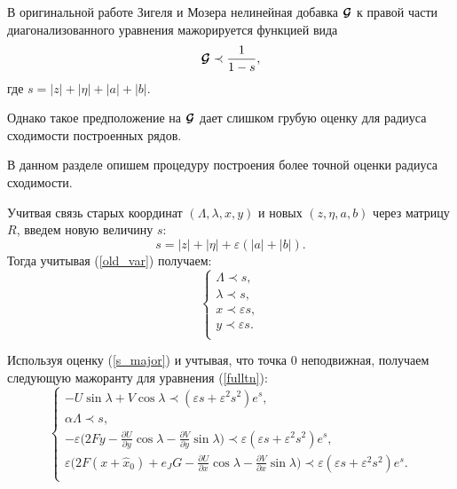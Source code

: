 В оригинальной работе Зигеля и Мозера \cite{siegel} нелинейная добавка $\boldsymbol{\mathcal{G}}$ к правой части диагонализованного уравнения мажорируется функцией вида
\begin{align*}
\boldsymbol{\mathcal{G}}  \prec \frac{1}{1-s},
\end{align*}
где $s = |z|+|\eta|+|a|+|b|$.


Однако такое предположение на $\boldsymbol{\mathcal{G}}$ дает слишком грубую оценку для радиуса сходимости построенных рядов.

В данном разделе опишем процедуру построения более точной оценки радиуса сходимости.

Учитвая связь старых координат $(\Lambda, \lambda, x, y)$ и новых $(z, \eta, a,b)$ через матрицу $R$, введем новую величину $s$:
$$s = |z| + |\eta| + \varepsilon(|a|+|b|).$$
Тогда учитывая (\ref{old_var}) получаем:
\begin{equation}
\begin{cases}
\Lambda \prec s,\\
\lambda \prec s,\\
x \prec \varepsilon s,\\
y \prec \varepsilon s.\\
\end{cases}
\label{s_major}
\end{equation}

Используя оценку (\ref{s_major}) и учтывая, что точка $0$ неподвижная, получаем следующую мажоранту для уравнения (\ref{fulltn}):
\begin{equation*}
    \begin{cases}
        - U \sin \lambda + V \cos \lambda \prec (\varepsilon s + \varepsilon^2 s^2)e^{s}, \\
        
        \alpha \Lambda \prec s, \\
        
        -\varepsilon \big( 2Fy-\frac{\partial U}{\partial y} \cos \lambda - \frac{\partial V}{\partial y} \sin \lambda \big) \prec \varepsilon (\varepsilon s + \varepsilon^2 s^2)e^{s}, \\
        
        \varepsilon \big( 2F(x+\hat x_0)+e_JG -\frac{\partial U}{\partial x} \cos \lambda - \frac{\partial V}{\partial x} \sin \lambda \big) \prec \varepsilon (\varepsilon s + \varepsilon^2 s^2)e^{s}. \\
    \end{cases}
\end{equation*}

